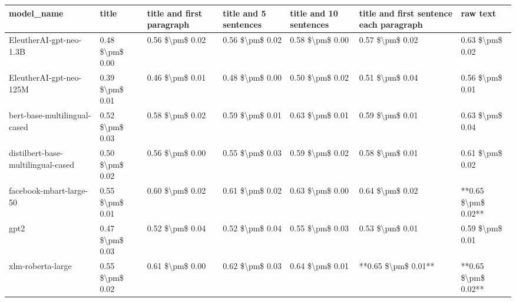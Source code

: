 \begin{tabular}{lllllll}
\toprule
                        model\_name &           title & title and first paragraph & title and 5 sentences & title and 10 sentences & title and first sentence each paragraph &            raw text \\
\midrule
           EleutherAI-gpt-neo-1.3B & 0.48 \$\textbackslash pm\$ 0.00 &           0.56 \$\textbackslash pm\$ 0.02 &       0.56 \$\textbackslash pm\$ 0.02 &        0.58 \$\textbackslash pm\$ 0.00 &                         0.57 \$\textbackslash pm\$ 0.02 &     0.63 \$\textbackslash pm\$ 0.02 \\
           EleutherAI-gpt-neo-125M & 0.39 \$\textbackslash pm\$ 0.01 &           0.46 \$\textbackslash pm\$ 0.01 &       0.48 \$\textbackslash pm\$ 0.00 &        0.50 \$\textbackslash pm\$ 0.02 &                         0.51 \$\textbackslash pm\$ 0.04 &     0.56 \$\textbackslash pm\$ 0.01 \\
      bert-base-multilingual-cased & 0.52 \$\textbackslash pm\$ 0.03 &           0.58 \$\textbackslash pm\$ 0.02 &       0.59 \$\textbackslash pm\$ 0.01 &        0.63 \$\textbackslash pm\$ 0.01 &                         0.59 \$\textbackslash pm\$ 0.01 &     0.63 \$\textbackslash pm\$ 0.04 \\
distilbert-base-multilingual-cased & 0.50 \$\textbackslash pm\$ 0.02 &           0.56 \$\textbackslash pm\$ 0.00 &       0.55 \$\textbackslash pm\$ 0.03 &        0.59 \$\textbackslash pm\$ 0.02 &                         0.58 \$\textbackslash pm\$ 0.01 &     0.61 \$\textbackslash pm\$ 0.02 \\
           facebook-mbart-large-50 & 0.55 \$\textbackslash pm\$ 0.01 &           0.60 \$\textbackslash pm\$ 0.02 &       0.61 \$\textbackslash pm\$ 0.02 &        0.63 \$\textbackslash pm\$ 0.00 &                         0.64 \$\textbackslash pm\$ 0.02 & **0.65 \$\textbackslash pm\$ 0.02** \\
                              gpt2 & 0.47 \$\textbackslash pm\$ 0.03 &           0.52 \$\textbackslash pm\$ 0.04 &       0.52 \$\textbackslash pm\$ 0.04 &        0.55 \$\textbackslash pm\$ 0.03 &                         0.53 \$\textbackslash pm\$ 0.01 &     0.59 \$\textbackslash pm\$ 0.01 \\
                 xlm-roberta-large & 0.55 \$\textbackslash pm\$ 0.02 &           0.61 \$\textbackslash pm\$ 0.00 &       0.62 \$\textbackslash pm\$ 0.03 &        0.64 \$\textbackslash pm\$ 0.01 &                     **0.65 \$\textbackslash pm\$ 0.01** & **0.65 \$\textbackslash pm\$ 0.02** \\
\bottomrule
\end{tabular}
